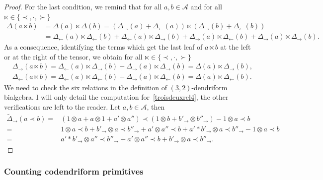 \documentclass[10pt,a4paper]{amsart}
\numberwithin{equation}{section}
\theoremstyle{definition}
\theoremstyle{plain}
\begin{document}
\begin{proof}
	For the last condition, we remind that for all $a,b\in \mathcal{A}$ and for all $\ltimes\in\{ \prec,\cdot,\succ\}$
	\begin{align*}
		\Delta(a\ltimes b)
		&= \Delta(a)\ltimes \Delta(b) = (\Delta_{\rightarrow}(a)+\Delta_{\leftarrow}(a))\ltimes (\Delta_{\rightarrow}(b)+\Delta_{\leftarrow}(b)) \\
		&= \Delta_{\leftarrow}(a)\ltimes \Delta_{\leftarrow}(b)+\Delta_{\leftarrow}(a)\ltimes \Delta_{\rightarrow}(b)+
		\Delta_{\rightarrow}(a)\ltimes \Delta_{\leftarrow}(b)+
		\Delta_{\rightarrow}(a)\ltimes \Delta_{\rightarrow}(b).
	\end{align*}
As a consequence, identifying the terms which get the last leaf of $a\ltimes b$ at the left or at the right of the tensor, we obtain for all $\ltimes\in\{\prec,\cdot,\succ\}$
	\begin{align*}
		&\Delta_{\rightarrow}(a\ltimes b) =\Delta_{\leftarrow}(a)\ltimes \Delta_{\rightarrow}(b)+\Delta_{\rightarrow}(a)\ltimes \Delta_{\rightarrow}(b) =\Delta(a)\ltimes \Delta_{\rightarrow}(b), \\
		&\Delta_{\leftarrow}(a\ltimes b)
		 =\Delta_{\leftarrow}(a)\ltimes\Delta_{\leftarrow}(b)+\Delta_{\rightarrow}(a)\ltimes \Delta_{\leftarrow}(b) =\Delta(a)\ltimes \Delta_{\leftarrow}(b).
	\end{align*}
We need to check the six relations in the definition of $(3,2)$-dendriform bialgebra. I will only detail the computation for~\eqref{troisdeuxrel4}, the other verifications are left to the reader. Let $a,b\in \mathcal{A}$, then
	\begin{align*}
		\tilde{\Delta}_{\rightarrow}(a\prec b)
		={}&(1\otimes a + a\otimes 1+a'\otimes a'')\prec (1\otimes b+b'_{\rightarrow}\otimes b''_{\rightarrow})- 1\otimes a\prec b\\
		={}&1\otimes a\prec b+b'_{\rightarrow}\otimes a\prec b''_{\rightarrow}+ a'\otimes a''\prec b+a'*b'_{\rightarrow}\otimes a\prec b''_{\rightarrow}-1\otimes a\prec b \\
		={}& a'*b'_{\rightarrow}\otimes a''\prec b''_{\rightarrow}+a'\otimes a''\prec b+b'_{\rightarrow}\otimes a\prec b''_{\rightarrow}. \tag*{\qed}
	\end{align*}
\renewcommand{\qed}{}
\end{proof}

\subsubsection{Counting codendriform primitives}
\end{document}
